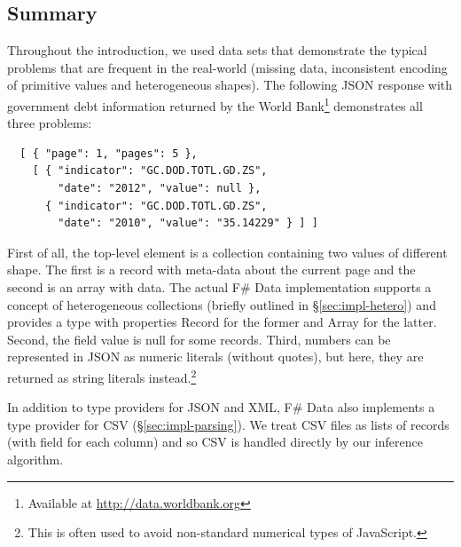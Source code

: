 \documentclass[10pt,preprint,clearpagebib]{sigplanconf}
\newcommand{\kvd}[1]{\textnormal{\textcolor{kvdclr}{\sffamily #1}}}
\newcommand{\ident}[1]{\textnormal{\sffamily #1}}
\begin{document}
\subsection{Summary}
\label{sec:providers-sum}
Throughout the introduction, we used data sets that demonstrate the typical problems that are frequent
in the real-world (missing data, inconsistent encoding of primitive values and heterogeneous shapes). 
The following JSON response with government debt information returned by the World Bank\footnote{Available at 
\url{http://data.worldbank.org}} demonstrates all three problems:
%
{\small{
\begin{verbatim}
  [ { "page": 1, "pages": 5 },
    [ { "indicator": "GC.DOD.TOTL.GD.ZS",
        "date": "2012", "value": null },
      { "indicator": "GC.DOD.TOTL.GD.ZS",
        "date": "2010", "value": "35.14229" } ] ]
\end{verbatim}
}}
%
\noindent
First of all, the top-level element is a collection containing two values of different shape.
The first is a record with meta-data about the current page and the second is an array with data. 
The actual F\# Data implementation supports a concept of heterogeneous collections (briefly outlined
in \S\ref{sec:impl-hetero}) and provides a type with properties \ident{Record} for the former and 
\ident{Array} for the latter. Second, the field \ident{value} is \kvd{null} for some records. Third, 
numbers can be represented in JSON as numeric literals (without quotes), but here, they are 
returned as string literals instead.\footnote{This is often used to avoid non-standard numerical 
types of JavaScript.}

In addition to type providers for JSON and XML, F\# Data also implements a type provider for CSV 
(\S\ref{sec:impl-parsing}). We treat CSV files as lists of records (with field for each column) 
and so CSV is handled directly by our inference algorithm.


%
%
\end{document}
